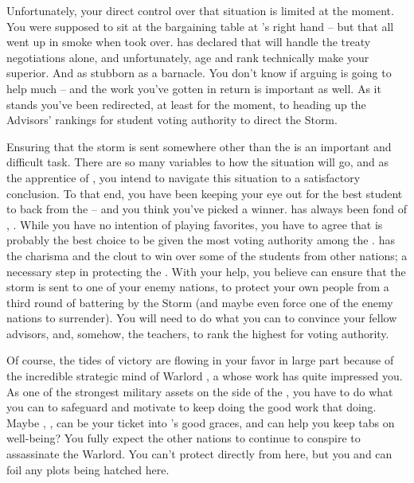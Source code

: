 \documentclass[char]{GL2020}
\begin{document}
Unfortunately, your direct control over that situation is limited at the moment. You were supposed to sit at the bargaining table at \cHeadDiplomat{}'s right hand -- but that all went up in smoke when \cEbbPriest{} took over. \cEbbPriest{} has declared that \cEbbPriest{\they} will handle the treaty negotiations alone, and unfortunately, \cEbbPriest{\their} age and rank technically make \cEbbPriest{\them} your superior. And \cEbbPriest{\theyare} as stubborn as a barnacle. You don't know if arguing is going to help much -- and the work you've gotten in return is important as well. As it stands you've been redirected, at least for the moment, to heading up the Advisors' rankings for student voting authority to direct the Storm. 

Ensuring that the storm is sent somewhere other than the \pShip{} is an important and difficult task. There are so many variables to how the situation will go, and as the apprentice of \cHeadDiplomat{}, you intend to navigate this situation to a satisfactory conclusion. To that end, you have been keeping your eye out for the best student to back from the \pShip{} -- and you think you've picked a winner. \cHeadDiplomat{} has always been fond of \cHeadDiplomat{\their} \cPresident{\nibling}, \cPresident{}. While you have no intention of playing favorites, you have to agree that \cPresident{} is probably the best choice to be given the most voting authority among the \pShippies{}. \cPresident{} has the charisma and the clout to win over some of the students from other nations; a necessary step in protecting the \pShip{}. With your help, you believe \cPresident{} can ensure that the storm is sent to one of your enemy nations, to protect your own people from a third round of battering by the Storm (and maybe even force one of the enemy nations to surrender). You will need to do what you can to convince your fellow \pShip{} advisors, and, somehow, the \pFarm{} teachers, to rank \cPresident{} the highest for voting authority.

Of course, the tides of victory are flowing in your favor in large part because of the incredible strategic mind of Warlord \cLoud{\full}, a \cLoud{\person} whose work has quite impressed you. As one of the strongest military assets on the side of the \pShip{}, you have to do what you can to safeguard and motivate \cLoud{} to keep doing the good work that \cLoud{\theyare} doing. Maybe \cLoud{\their} \cWarlordDaughter{\child}, \cWarlordDaughter{\full}, can be your ticket into \cLoud{}'s good graces, and can help you keep tabs on \cLoud{\their} well-being? You fully expect the other nations to continue to conspire to assassinate the Warlord. You can't protect \cLoud{} directly from here, but you and \cWarlordDaughter{} can foil any plots being hatched here. 
\end{document}
